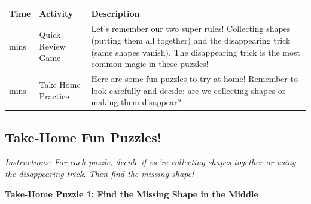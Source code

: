 \documentclass{article}
\begin{document}
\begin{tabularx}{\textwidth}{|>{\raggedright\arraybackslash}p{1cm}|>{\raggedright\arraybackslash}p{3cm}|>{\raggedright\arraybackslash}X|}
\hline
\textbf{Time} & \textbf{Activity} & \textbf{Description} \\
\hline
4 mins & Quick Review Game & Let's remember our two super rules! Collecting shapes (putting them all together) and the disappearing trick (same shapes vanish). The disappearing trick is the most common magic in these puzzles! \\
\hline
6 mins & Take-Home Practice & Here are some fun puzzles to try at home! Remember to look carefully and decide: are we collecting shapes or making them disappear? \\
\hline
\end{tabularx}

\subsection*{Take-Home Fun Puzzles!}
\textit{Instructions: For each puzzle, decide if we're collecting shapes together or using the disappearing trick. Then find the missing shape!}

\vspace{0.2cm}
\noindent\textbf{Take-Home Puzzle 1: Find the Missing Shape in the Middle}

\begin{center}
\end{center}
\end{document}
